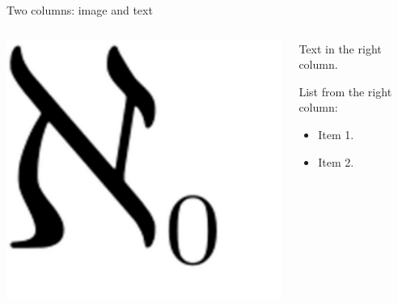 \documentclass[
  11pt,
  ignorenonframetext,
  aspectratio=169,
  aspectratio=169]{beamer}
\providecommand{\tightlist}{%
  \setlength{\itemsep}{0pt}\setlength{\parskip}{0pt}}
\begin{document}
\begin{frame}{Two columns: image and text}
\protect\hypertarget{two-columns-image-and-text}{}
\begin{columns}[T]
\begin{column}{0.48\textwidth}
\includegraphics[width=\textwidth,height=0.5\textheight]{img/aleph0.png}
\end{column}

\begin{column}{0.48\textwidth}
Text in the right column.

List from the right column:

\begin{itemize}
\tightlist
\item
  Item 1.
\item
  Item 2.
\end{itemize}
\end{column}
\end{columns}
\end{frame}
\end{document}
